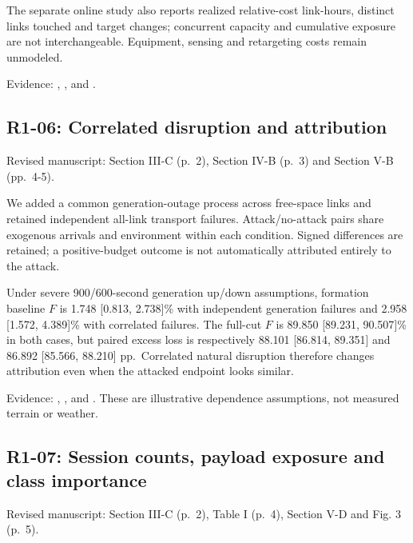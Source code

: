 \documentclass[a4paper,11pt]{article}
\begin{document}
The separate online study also reports realized relative-cost link-hours, distinct links touched and target changes; concurrent capacity and cumulative exposure are not interchangeable. Equipment, sensing and retargeting costs remain unmodeled.

Evidence: , , and .

\subsection{R1-06: Correlated disruption and attribution}\label{r1-06-correlated-disruption-and-attribution}

Revised manuscript: Section III-C (p.~2), Section IV-B (p.~3) and Section V-B (pp.~4-5).

We added a common generation-outage process across free-space links and retained independent all-link transport failures. Attack/no-attack pairs share exogenous arrivals and environment within each condition. Signed differences are retained; a positive-budget outcome is not automatically attributed entirely to the attack.

Under severe 900/600-second generation up/down assumptions, formation baseline \(F\) is 1.748 {[}0.813, 2.738{]}\% with independent generation failures and 2.958 {[}1.572, 4.389{]}\% with correlated failures. The full-cut \(F\) is 89.850 {[}89.231, 90.507{]}\% in both cases, but paired excess loss is respectively 88.101 {[}86.814, 89.351{]} and 86.892 {[}85.566, 88.210{]} pp.~Correlated natural disruption therefore changes attribution even when the attacked endpoint looks similar.

Evidence: , , and . These are illustrative dependence assumptions, not measured terrain or weather.

\subsection{R1-07: Session counts, payload exposure and class importance}\label{r1-07-session-counts-payload-exposure-and-class-importance}

Revised manuscript: Section III-C (p.~2), Table I (p.~4), Section V-D and Fig. 3 (p.~5).
\end{document}
